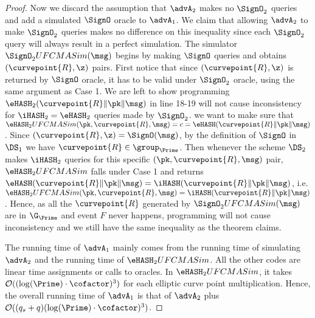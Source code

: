 \begin{proof}
	Now we discard the assumption that $\advA_2$ makes no $\SignO_2$ queries and add a simulated $\SignO$ oracle to $\advA_1$. We claim that allowing $\advA_2$ to make $\SignO_2$ queries makes no difference on this inequality since each $\SignO_2$ query will always result in a perfect simulation. The simulator $\SignO_2 UFCMASim(\msg)$ begins by making $\SignO$ queries and obtains $(\curvepoint{R}, \z)$ pairs. First notice that since $(\curvepoint{R}, \z)$ is returned by $\SignO$ oracle, it has to be valid under $\SignO_2$ oracle, using the same argument as Case 1. We are left to show programming $\eHASH_2(\curvepoint{R}\|\pk\| \msg)$ in line 18-19 will not cause inconsistency for $\iHASH_2=\eHASH_2$ queries made by $\SignO_2$. we want to make sure that $\eHASH_2UFCMASim(\pk, \curvepoint{R},  \msg) = c = \eHASH(\curvepoint{R}\|\pk\| \msg)$. Since $(\curvepoint{R}, \z) = \SignO(\msg)$, by the definition of $\SignO$ in $\DS_1$ we have $\curvepoint{R} \in \group_{\Prime}$. Then whenever the scheme $\DS_2$ makes $\iHASH_2$ queries for this specific $(\pk, \curvepoint{R}, \msg)$ pair, $\eHASH_2UFCMASim$ falls under Case 1 and returns $\eHASH(\curvepoint{R}\|\pk\| \msg) = \iHASH(\curvepoint{R}\|\pk\| \msg)$, i.e. $\eHASH_2UFCMASim(\pk, \curvepoint{R},  \msg) = \iHASH(\curvepoint{R}\|\pk\| \msg)$. Hence, as all the $\curvepoint{R}$ generated by $\SignO_2 UFCMASim(\msg)$ are in $\G_\Prime$ and event $F$ never happens, programming will not cause inconsistency and we still have the same inequality as the theorem claims.
	
	The running time of $\advA_1$ mainly comes from the running time of simulating $\advA_2$ and the running time of $\eHASH_2UFCMASim$. All the other codes are linear time assignments or calls to oracles. In $\eHASH_2UFCMASim$, it takes $\mathcal{O}((\log(\Prime) \cdot \cofactor)^3)$ for each elliptic curve point multiplication. Hence, the overall running time of $\advA_1$ is that of $\advA_2$ plus $\mathcal{O}((q_s + q)(\log(\Prime) \cdot \cofactor)^3)$.
\end{proof}



